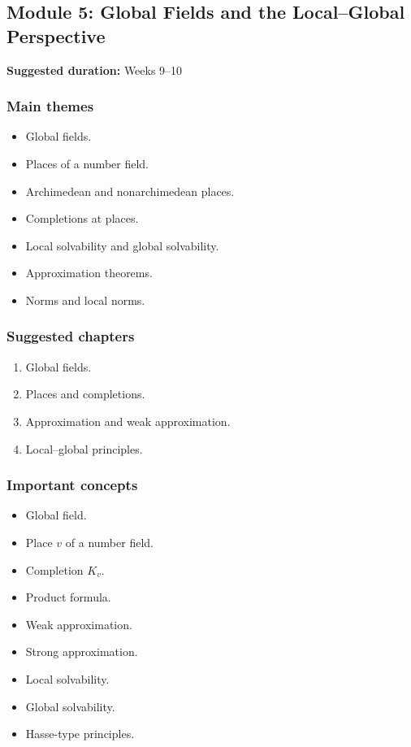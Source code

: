 \documentclass[11pt]{article}
\begin{document}
\subsection{Module 5: Global Fields and the Local--Global Perspective}

\textbf{Suggested duration:} Weeks 9--10

\subsubsection*{Main themes}

\begin{itemize}
    \item Global fields.
    \item Places of a number field.
    \item Archimedean and nonarchimedean places.
    \item Completions at places.
    \item Local solvability and global solvability.
    \item Approximation theorems.
    \item Norms and local norms.
\end{itemize}

\subsubsection*{Suggested chapters}

\begin{enumerate}
    \item Global fields.
    \item Places and completions.
    \item Approximation and weak approximation.
    \item Local--global principles.
\end{enumerate}

\subsubsection*{Important concepts}

\begin{itemize}
    \item Global field.
    \item Place \(v\) of a number field.
    \item Completion \(K_v\).
    \item Product formula.
    \item Weak approximation.
    \item Strong approximation.
    \item Local solvability.
    \item Global solvability.
    \item Hasse-type principles.
\end{itemize}
\end{document}
